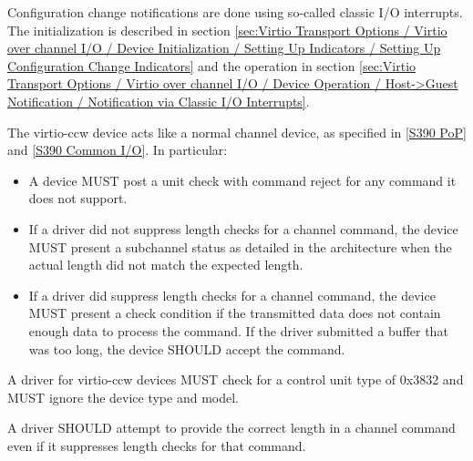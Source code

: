 Configuration change notifications are done using so-called classic I/O
interrupts. The initialization is described in section \ref{sec:Virtio
Transport Options / Virtio over channel I/O / Device Initialization /
Setting Up Indicators / Setting Up Configuration Change Indicators} and
the operation in section \ref{sec:Virtio Transport Options / Virtio over
channel I/O / Device Operation / Host->Guest Notification / Notification
via Classic I/O Interrupts}.


The virtio-ccw device acts like a normal channel device, as specified
in \hyperref[intro:S390 PoP]{[S390 PoP]} and \hyperref[intro:S390 Common I/O]{[S390 Common I/O]}. In particular:

\begin{itemize}
\item A device MUST post a unit check with command reject for any command
  it does not support.

\item If a driver did not suppress length checks for a channel command,
  the device MUST present a subchannel status as detailed in the
  architecture when the actual length did not match the expected length.

\item If a driver did suppress length checks for a channel command, the
  device MUST present a check condition if the transmitted data does
  not contain enough data to process the command. If the driver submitted
  a buffer that was too long, the device SHOULD accept the command.
\end{itemize}


A driver for virtio-ccw devices MUST check for a control unit
type of 0x3832 and MUST ignore the device type and model.

A driver SHOULD attempt to provide the correct length in a channel
command even if it suppresses length checks for that command.

